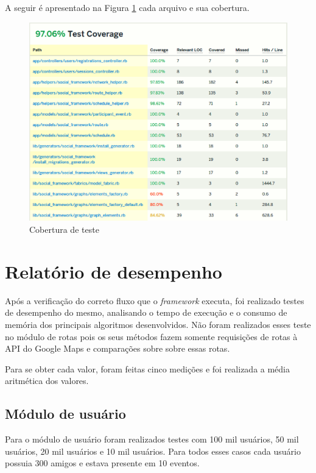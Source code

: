A seguir é apresentado na Figura \ref{Cobertura_teste} cada arquivo e sua cobertura.

\begin{figure}[!h]
	\centering
	\includegraphics[scale=0.55]{figuras/capitulo7/cobertura.eps}
	\caption[Cobertura de teste]{Cobertura de teste}
	\label{Cobertura_teste}
\end{figure}

\section{Relatório de desempenho}

Após a verificação do correto fluxo que o \textit{framework} executa, foi realizado testes de desempenho do mesmo, analisando o tempo de execução e o consumo de memória dos principais algoritmos desenvolvidos. Não foram realizados esses teste no módulo de rotas pois os seus métodos fazem somente requisições de rotas à API do Google Maps e comparações sobre sobre essas rotas.

Para se obter cada valor, foram feitas cinco medições e foi realizada a média aritmética dos valores.

\subsection{Módulo de usuário}

Para o módulo de usuário foram realizados testes com 100 mil usuários, 50 mil usuários, 20 mil usuários e 10 mil usuários. Para todos esses casos cada usuário possuia 300 amigos e estava presente em 10 eventos.

